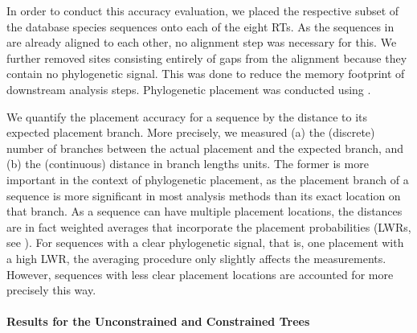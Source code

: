In order to conduct this accuracy evaluation,
we placed the respective subset of the  database species sequences onto each of the eight \acp{RT}.
As the sequences in  are already aligned to each other, no alignment step was necessary for this.
We further removed sites consisting entirely of gaps from the alignment because they contain no phylogenetic signal.
This was done to reduce the memory footprint of downstream analysis steps.
Phylogenetic placement was conducted using  \citep{Barbera2018}.

We quantify the placement accuracy for a sequence by the distance to its expected placement branch.
More precisely, we measured (a) the (discrete) number of branches between the actual placement and the expected branch,
and (b) the (continuous) distance in branch lengths units.
The former is more important in the context of phylogenetic placement,
as the placement branch of a sequence is more significant in most analysis methods than its exact location on that branch.
As a sequence can have multiple placement locations,
the distances are in fact weighted averages that incorporate the placement probabilities
(LWRs, see ).
For sequences with a clear phylogenetic signal, that is, one placement with a high \ac{LWR},
the averaging procedure only slightly affects the measurements.
However, sequences with less clear placement locations are accounted for more precisely this way.


\paragraph{Results for the Unconstrained and Constrained Trees}
\label{ch:AutomaticTrees:sec:Evaluation:sub:Accuracy:par:UnconstrainedConstrainedResults}

